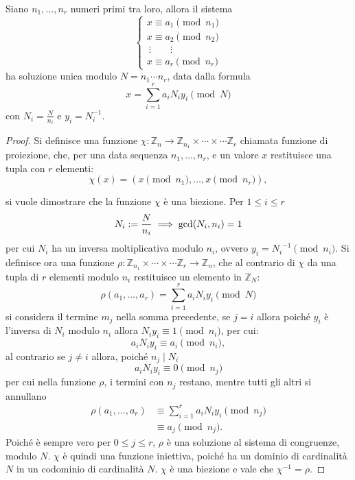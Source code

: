 


\begin{theorem}
    Siano $n_1,\dots,n_r$ numeri primi tra loro, allora il sistema
    \begin{equation}
        \begin{cases}
            x \equiv a_1 \pmod n_1\\
            x \equiv a_2 \pmod n_2\\
            \ \vdots \qquad \vdots\\
            x \equiv a_r \pmod n_r
        \end{cases}
    \end{equation}
ha soluzione unica modulo $N = n_1 \cdots n_r$, data dalla formula 
\[
    x = \sum_{i=1}^{r}a_i N_i y_i \pmod N
\]
con $N_i = \frac{N}{n_i}$ e $y_i = N_i^{-1}$.
\end{theorem}
\begin{proof}
    Si definisce una funzione $\chi: \mathbb{Z}_n \to \mathbb{Z}_{n_1} \times \cdots \times \cdots \mathbb{Z}_{r}$ chiamata funzione di proiezione, che, per una data sequenza $n_1,\dots,n_r$, e un valore $x$ restituisce una tupla con $r$ elementi:
    \[
        \chi(x) = (x \pmod n_1, \dots, x \pmod n_r),
    \]
    
    si vuole dimostrare che la funzione $\chi$ è una biezione. Per $1 \leq i \leq r$ 
    \begin{equation*}
        N_i := \frac{N}{n_i} \implies \gcd(N_i,n_i) = 1\\
    \end{equation*}
    per cui $N_i$ ha un inversa moltiplicativa modulo $n_i$, ovvero $y_i = {N_i}^{-1} \pmod n_i$. Si definisce ora una funzione $\rho:\mathbb{Z}_{n_1} \times \cdots \times \cdots \mathbb{Z}_{r} \to \mathbb{Z}_n$, che al contrario di $\chi$ da una tupla di $r$ elementi modulo $n_i$ restituisce un elemento in $\mathbb{Z}_N$:
    \[
        \rho(a_1,\dots,a_r) = \sum_{i=1}^{r}a_i N_i y_i \pmod N
    \]
    si considera il termine $m_j$ nella somma precedente, se $j = i$ allora poiché $y_i$ è l'inversa di $N_i$ modulo $n_i$ allora $N_i y_i \equiv 1 \pmod{n_i}$, per cui:  
    \[
        a_i N_i y_i \equiv a_i \pmod{n_i},
    \] al contrario se $j \neq i$ allora, poiché $n_j \mid N_i$
    \[
        a_i N_i y_i \equiv 0 \pmod {n_j}
    \]
    per cui nella funzione $\rho$, i termini con $n_j$ restano, mentre tutti gli altri si annullano
    \begin{align*}        
        \rho(a_1,\dots,a_r) &\equiv \sum_{i=1}^{r} a_i N_i y_i \pmod {n_j}\\
        &\equiv a_j \pmod{n_j}. 
    \end{align*}
    Poiché è sempre vero per $0\leq j \leq r$, $\rho$ è una soluzione al sistema di congruenze, modulo $N$. $\chi$ è quindi una funzione iniettiva, poiché ha un dominio di cardinalità $N$ in un codominio di cardinalità $N$. $\chi$ è una biezione e vale che $\chi^{-1} = \rho$.
\end{proof}

